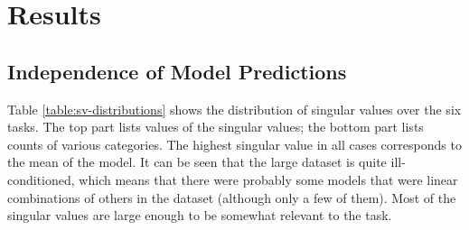 \documentclass{article}
\begin{document}
\section{Results}

\subsection{Independence of Model Predictions}
\label{sec:svd-decomposition-results}

Table \ref{table:sv-distributions} shows the distribution of singular values over the six tasks.  The top part lists values of the singular values; the bottom part lists counts of various categories.  The highest singular value in all cases corresponds to the mean of the model.  It can be seen that the large dataset is quite ill-conditioned, which means that there were probably some models that were linear combinations of others in the dataset (although only a few of them).  Most of the singular values are large enough to be somewhat relevant to the task.

\end{document}
